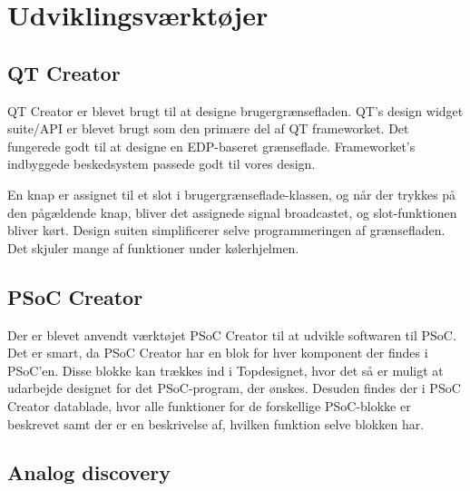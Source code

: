 \chapter{Udviklingsværktøjer}

\section{QT Creator}
QT Creator er blevet brugt til at designe brugergrænsefladen.
QT's design widget suite/API er blevet brugt som den primære del af QT frameworket. Det fungerede godt til at designe en EDP-baseret grænseflade. Frameworket's indbyggede beskedsystem passede godt til vores design.

En knap er assignet til et slot i brugergrænseflade-klassen, og når der trykkes på den pågældende knap, bliver det assignede signal broadcastet, og slot-funktionen bliver kørt.
Design suiten simplificerer selve programmeringen af grænsefladen. Det skjuler mange af funktioner under kølerhjelmen.

\section{PSoC Creator}
Der er blevet anvendt værktøjet PSoC Creator til at udvikle softwaren til PSoC. Det er smart, da PSoC Creator har en blok for hver komponent der findes i PSoC'en. Disse blokke kan trækkes ind i Topdesignet, hvor det så er muligt at udarbejde designet for det PSoC-program, der ønskes. Desuden findes der i PSoC Creator datablade, hvor alle funktioner for de forskellige PSoC-blokke er beskrevet samt der er en beskrivelse af, hvilken funktion selve blokken har.

\section{Analog discovery}
